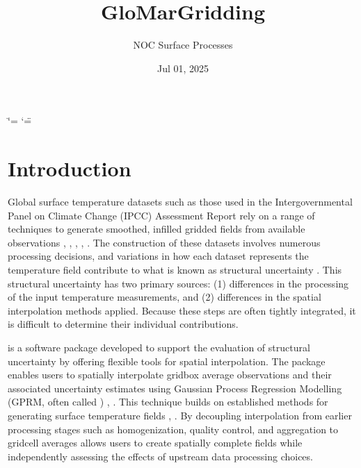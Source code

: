 \documentclass[letterpaper,10pt,english]{sphinxmanual}
\title{GloMarGridding}
\date{Jul 01, 2025}
\author{NOC Surface Processes}
\begin{document}
\ifdefined\shorthandoff
  \ifnum\catcode`\=\string=\active\shorthandoff{=}\fi
  \ifnum\catcode`\"=\active{}\fi
\fi

\pagestyle{empty}
\sphinxmaketitle
\pagestyle{plain}
\sphinxtableofcontents
\pagestyle{normal}
\label{\detokenize{index::doc}}


\sphinxstepscope


\chapter{Introduction}
\label{\detokenize{introduction:introduction}}\label{\detokenize{introduction::doc}}
\sphinxAtStartPar
Global surface temperature datasets \sphinxhyphen{} such as those used in the Intergovernmental Panel on Climate
Change (IPCC) Assessment Report  rely on a range of techniques to generate smoothed, infilled
gridded fields from available observations , , , ,
 . The construction of these datasets involves numerous processing decisions, and variations
in how each dataset represents the temperature field contribute to what is known as structural
uncertainty . This structural uncertainty has two primary sources: (1) differences in the
processing of the input temperature measurements, and (2) differences in the spatial interpolation
methods applied. Because these steps are often tightly integrated, it is difficult to determine
their individual contributions.

\sphinxAtStartPar
{} is a software package developed to support the evaluation of structural
uncertainty by offering flexible tools for spatial interpolation. The package enables users to
spatially interpolate grid\sphinxhyphen{}box average observations and their associated uncertainty estimates using
Gaussian Process Regression Modelling (GPRM, often called ) ,  . This
technique builds on established methods for generating surface temperature fields ,
. By decoupling interpolation from earlier processing stages \sphinxhyphen{} such as homogenization,
quality control, and aggregation to grid\sphinxhyphen{}cell averages \sphinxhyphen{}  allows users to create
spatially complete fields while independently assessing the effects of upstream data processing
choices.
\end{document}
